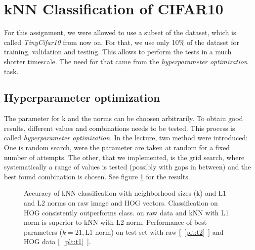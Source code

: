 \clearpage
\section{kNN Classification of CIFAR10} %
For this assignment, we were allowed to use a subset of the  dataset, which is called \emph{TinyCifar10} from now on. For that, we use only 10\% of the dataset for training, validation and testing. This allows to perform the tests in a much shorter timescale. The need for that came from the \emph{hyperparameter optimization} task.
\subsection{Hyperparameter optimization}
The parameter for k and the norms can be choosen arbitrarily. To obtain good results, different values and combinations needs to be tested. This process is called \emph{hyperparameter optimization}. In the lecture, two method were introduced: One is random search, were the parameter are taken at random for a fixed number of attempts. The other, that we implemented, is the grid search, where systematically a range of values is tested (possibly with gaps in between) and the best found combination is chosen. See figure \ref{figparam} for the results.

\begin{figure}[h!t]
\newcommand{\plotref}[1]{{[~\ref{plt:#1}~]}}
\centering

\caption{Accuracy of kNN classification with neighborhood sizes (k) and L1 and L2 norms on raw image and HOG vectors. Classification on HOG consistently outperforms class. on raw data and kNN with L1 norm is superior to kNN with L2 norm. Performance of best parameters ($k=21, \text{L1 norm}$) on test set with raw \plotref{t2} and HOG data \plotref{t1}. }
\label{figparam}

\end{figure}



\newpage



